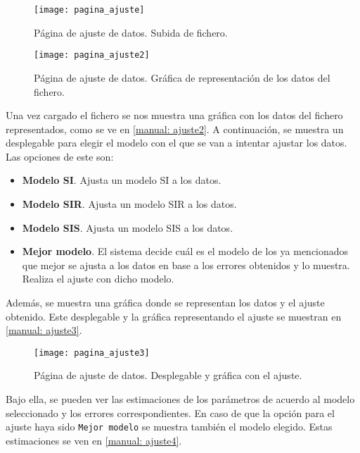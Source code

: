 \begin{figure}
\begin{center}
\caption{Página de ajuste de datos. Subida de fichero.}
\label{manual: ajuste1}
\texttt{[image: pagina\_ajuste]}
\end{center}
\end{figure}

\begin{figure}
\begin{center}
\caption{Página de ajuste de datos. Gráfica de representación de los datos del fichero.}
\label{manual: ajuste2}
\texttt{[image: pagina\_ajuste2]}
\end{center}
\end{figure}

Una vez cargado el fichero se nos muestra una gráfica con los datos del fichero representados, como se ve en \eqref{manual: ajuste2}. A continuación, se muestra un desplegable para elegir el modelo con el que se van a intentar ajustar los datos. Las opciones de este son:

\begin{itemize}
\item \textbf{Modelo SI}. Ajusta un modelo SI a los datos.
\item \textbf{Modelo SIR}. Ajusta un modelo SIR a los datos.
\item \textbf{Modelo SIS}. Ajusta un modelo SIS a los datos.
\item \textbf{Mejor modelo}. El sistema decide cuál es el modelo de los ya mencionados que mejor se ajusta a los datos en base a los errores obtenidos y lo muestra. Realiza el ajuste con dicho modelo.
\end{itemize}

Además, se muestra una gráfica donde se representan los datos y el ajuste obtenido. Este desplegable y la gráfica representando el ajuste se muestran en \eqref{manual: ajuste3}.

\begin{figure}
\begin{center}
\caption{Página de ajuste de datos. Desplegable y gráfica con el ajuste.}
\label{manual: ajuste3}
\texttt{[image: pagina\_ajuste3]}
\end{center}
\end{figure}

Bajo ella, se pueden ver las estimaciones de los parámetros de acuerdo al modelo seleccionado y los errores correspondientes. En caso de que la opción para el ajuste haya sido \verb|Mejor modelo| se muestra también el modelo elegido. Estas estimaciones se ven en \eqref{manual: ajuste4}.

